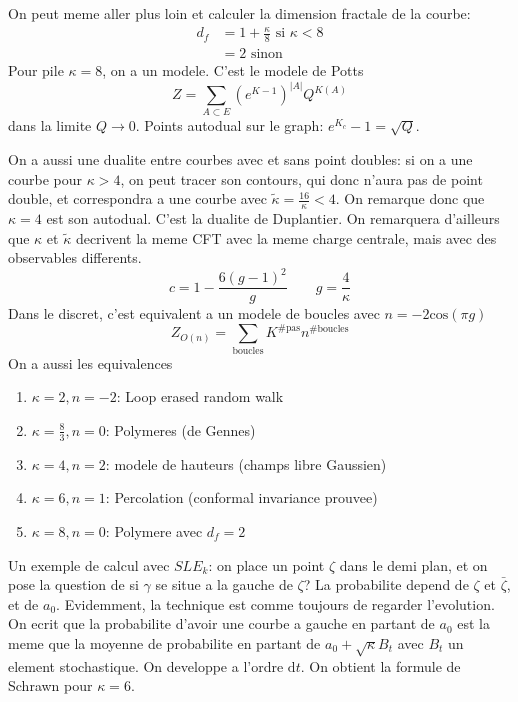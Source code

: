 \documentclass[a4paper]{book}
\theoremstyle{definition}
\theoremstyle{remark}
\begin{document}
On peut meme aller plus loin et calculer la dimension fractale de la courbe: 
\begin{equation}
    \begin{aligned}
        d_f &= 1 + \frac{\kappa}{8} \text{ si } \kappa < 8 \\
        &= 2 \text{ sinon}
    \end{aligned}
\end{equation}
Pour pile $\kappa = 8$, on a un modele. C'est le modele de Potts
\begin{equation}
    Z = \sum_{A \subset E} (e^{K-1})^{|A|} Q^{K(A)}
\end{equation}
dans la limite $Q \rightarrow 0$. Points autodual sur le graph: $e^{K_c} - 1 = \sqrt{Q}$. \par \medskip 

On a aussi une dualite entre courbes avec et sans point doubles: si on a une courbe pour $\kappa > 4$, on peut tracer son contours, qui donc n'aura pas de point double, et correspondra a une courbe avec $\tilde \kappa = \frac{16}{\kappa} < 4$. On remarque donc que $\kappa = 4$ est son autodual. C'est la dualite de Duplantier. On remarquera d'ailleurs que $\kappa$ et $\tilde \kappa$ decrivent la meme CFT avec la meme charge centrale, mais avec des observables differents. 
\begin{equation}
    c = 1 - \frac{6(g-1)^2}{g} \qquad g = \frac{4}{\kappa}
\end{equation}
Dans le discret, c'est equivalent a un modele de boucles avec $n = -2\text{cos}(\pi g)$
\begin{equation}
    Z_{O(n)} = \sum_{\text{boucles}} K^{\#\text{pas}} n^{\#\text{boucles}}
\end{equation}
On a aussi les equivalences 
\begin{enumerate}
    \item $\kappa = 2, n = -2$: Loop erased random walk
    \item $\kappa = \frac{8}{3}, n = 0$: Polymeres (de Gennes)
    \item $\kappa = 4, n = 2$: modele de hauteurs (champs libre Gaussien)
    \item $\kappa = 6, n = 1$: Percolation (conformal invariance prouvee)
    \item $\kappa = 8, n = 0$: Polymere avec $d_f = 2$
\end{enumerate}

Un exemple de calcul avec $SLE_k$: on place un point $\zeta$ dans le demi plan, et on pose la question de si $\gamma$ se situe a la gauche de $\zeta$? La probabilite depend de $\zeta$ et $\bar \zeta$, et de $a_0$. Evidemment, la technique est comme toujours de regarder l'evolution. On ecrit que la probabilite d'avoir une courbe a gauche en partant de $a_0$ est la meme que la moyenne de probabilite en partant de $a_0 + \sqrt{\kappa} B_t$ avec $B_t$ un element stochastique. On developpe a l'ordre $\text{d}t$. On obtient la formule de Schrawn pour $\kappa = 6$. \par \medskip 
\end{document}
